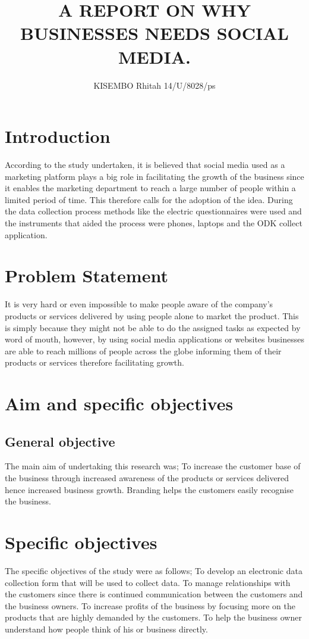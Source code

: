 \documentclass[12pt]{article}
\begin{document}
\title{ A REPORT ON WHY BUSINESSES NEEDS SOCIAL MEDIA.}


\maketitle
\author {KISEMBO Rhitah  14/U/8028/ps}

\section{Introduction}
According to the study undertaken, it is believed that social media used as a marketing platform plays a  big role in facilitating the growth of the business since it enables the marketing department to reach a large number of people within a limited period of time. This therefore calls for the adoption of the idea.
During the data collection process methods like the electric questionnaires were used and the instruments that aided the process were phones, laptops and the ODK collect application.

\section{ Problem Statement}
It is very hard or even impossible to make people aware of the company’s products or services delivered by using people alone to market the product. This is simply because they might not be able to do the assigned tasks as expected by word of mouth, however, by using social media applications or websites businesses are able to reach millions of people across the globe informing them of their products or services therefore facilitating growth.
\section{Aim and specific objectives}
\subsection{General objective}
The main aim of undertaking this research was;
To increase the customer base of the business through increased awareness of the products or services delivered hence increased business growth. Branding helps the customers easily recognise the business.
\section{Specific objectives}
The specific objectives of the study were as follows;
To develop an electronic data collection form that will be used to collect data.
To manage relationships with the customers since there is continued communication between the customers and the business owners.
To increase profits of the business by focusing more on the products that are highly demanded by the customers.
To help the business owner understand how people think of his or business directly.
\end{document}
